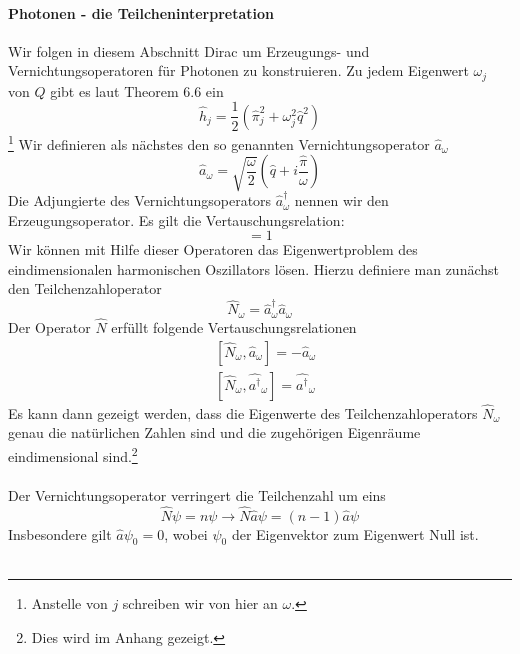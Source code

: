 \documentclass[11pt,a4paper,leqno]{report}
\numberwithin{equation}{chapter}
\begin{document}
\paragraph{Photonen - die Teilcheninterpretation}
Wir folgen in diesem Abschnitt Dirac um Erzeugungs- und Vernichtungsoperatoren f\"ur Photonen zu konstruieren. Zu jedem Eigenwert $\omega_j$ von $Q$ gibt es laut Theorem 6.6 ein 
\begin{equation*}
	\hat{h}_j = \frac{1}{2}(\hat{\pi}_j^2 + \omega_j^2 \hat{q}^2)
\end{equation*}\footnote{Anstelle von $j$ schreiben wir von hier an $\omega$.}
Wir definieren als n\"achstes den so genannten Vernichtungsoperator $\hat{a}_\omega$
\begin{equation*}
	\hat{a}_\omega = \sqrt{\frac{\omega}{2}}(\hat{q} + i \frac{\hat{\pi}}{\omega})
\end{equation*}
Die Adjungierte des Vernichtungsoperators $\hat{a}_\omega^\dagger$ nennen wir den Erzeugungsoperator. Es gilt die Vertauschungsrelation:
\begin{equation*}
	[\hat{a}_\omega, \hat{a}_\omega^\dagger] = 1
\end{equation*}
Wir k\"onnen mit Hilfe dieser Operatoren das Eigenwertproblem des eindimensionalen harmonischen Oszillators l\"osen. Hierzu definiere man zun\"achst den Teilchenzahloperator 
\begin{equation*}
	\hat{N}_\omega =\hat{a}^\dagger_\omega\hat{a}_\omega
\end{equation*}
Der Operator $\hat{N}$ erf\"ullt folgende Vertauschungsrelationen
\begin{align*}
	& [\hat{N}_\omega, \hat{a}_\omega] = -\hat{a}_\omega\\
	& [\hat{N}_\omega, \hat{a^\dagger}_\omega] = \hat{a^\dagger}_\omega
\end{align*}
Es kann dann gezeigt werden, dass die Eigenwerte des Teilchenzahloperators $\hat{N}_\omega$ genau die nat\"urlichen Zahlen sind und die zugeh\"origen Eigenr\"aume eindimensional sind.\footnote{Dies wird im Anhang gezeigt.}
\\
\\
Der Vernichtungsoperator verringert die Teilchenzahl um eins
\begin{equation*}
	\hat{N}\psi = n \psi \rightarrow \hat{N}\hat{a}\psi = (n-1)\hat{a}\psi
\end{equation*} 
Insbesondere gilt $\hat{a}\psi_0=0$, wobei $\psi_0$ der Eigenvektor zum Eigenwert Null ist.\\
\\
\end{document}
